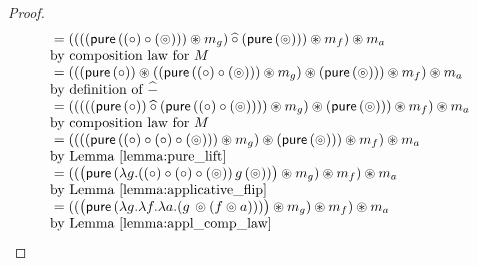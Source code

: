 \begin{proof}
$$
\begin{array}{ll}
{}= (  (( (\mathsf{pure}\, ((\circ) \circ (\circledcirc)) ) \circledast m_g ) \mathbin{\widehat{\circ}} (\mathsf{pure}\, (\circledcirc))) \circledast m_f  ) \circledast m_a\\
 \mbox{by composition law for }M \\
{}= (  ( (\mathsf{pure}\, (\circ)) \circledast ( (\mathsf{pure}\, ((\circ) \circ (\circledcirc)) ) \circledast m_g ) \circledast (\mathsf{pure}\, (\circledcirc)) ) \circledast m_f  ) \circledast m_a\\
 \mbox{by definition of }\mathbin{\widehat{-}} \\
{}= (  ( (  ((\mathsf{pure}\, (\circ)) \mathbin{\widehat{\circ}}  (\mathsf{pure}\, ((\circ) \circ (\circledcirc)) )) \circledast m_g  ) \circledast (\mathsf{pure}\, (\circledcirc)) ) \circledast m_f  ) \circledast m_a\\
 \mbox{by composition law for }M \\
{}= (  ( (  (\mathsf{pure}\, ((\circ) \circ (\circ) \circ (\circledcirc))) \circledast m_g  ) \circledast (\mathsf{pure}\, (\circledcirc)) ) \circledast m_f  ) \circledast m_a\\
 \mbox{by Lemma \ref{lemma:pure_lift}}\\
{}= (  (  \big(\mathsf{pure}\, (\lambda g . ((\circ) \circ (\circ) \circ (\circledcirc))\, g\, (\circledcirc) ) \big) \circledast m_g   ) \circledast m_f  ) \circledast m_a\\
 \mbox{by Lemma \ref{lemma:applicative_flip}}\\
{}= (  (  \big(\mathsf{pure}\, (\lambda g . \lambda f . \lambda a . (g\, \circledcirc (f \circledcirc a)) ) \big) \circledast m_g   ) \circledast m_f  ) \circledast m_a\\
 \mbox{by Lemma \ref{lemma:appl_comp_law}}\\
\end{array}
$$


\end{proof}



















